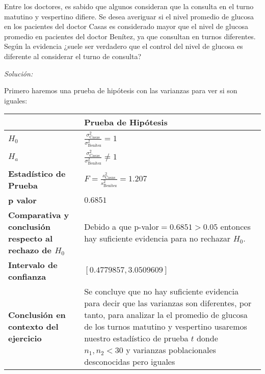 \documentclass[12pt]{article}
\newenvironment{problem}[2][Problema]{\begin{trivlist}
\item[\hskip \labelsep {\bfseries #1}\hskip \labelsep {\bfseries #2.}]}{\end{trivlist}}
\newenvironment{sol}
    {\emph{Solución:}
    }
    {
    }
\begin{document}
\begin{problem}{D}
Entre los doctores, es sabido que algunos consideran que la consulta en el turno matutino y vespertino difiere. Se desea averiguar si el nivel promedio de glucosa en los pacientes del doctor Casas es considerado mayor que el nivel de glucosa promedio en pacientes del doctor Benítez, ya que consultan en turnos diferentes.  Según la evidencia ¿suele ser verdadero que el control del nivel de glucosa es diferente al considerar el turno de consulta?
\end{problem}

\begin{sol}
Primero haremos una prueba de hipótesis con las varianzas para ver si son iguales:
\begin{table}[h!]
\centering
\begin{tabular}{|>{\raggedright\arraybackslash}m{6cm}|>{\raggedright\arraybackslash}m{6cm}|}
\hline
 & \textbf{Prueba de Hipótesis} \\ \hline
$H_0$ & \vspace{0.5cm}$\frac{\sigma_{\text{Casas}}^2}{\sigma_{\text{Benítez}
}^2}=1$ \vspace{0.5cm}\\ \hline
$H_a$ & \vspace{0.5cm} $\frac{\sigma_{\text{Casas}}^2}{\sigma_{\text{Benítez}
}^2}\neq1$ \vspace{0.5cm}\\ \hline
\textbf{Estadístico de Prueba} & \vspace{0.5cm}$F = \frac{s_\text{Casas}^2}{s_\text{Benítez}^2}=1.207$\vspace{0.5cm} \\ \hline
\textbf{p valor} & $0.6851$ \\ \hline
\textbf{Comparativa y conclusión respecto al rechazo de $H_0$} & Debido a que p-valor$=0.6851>0.05$ entonces hay suficiente evidencia para no rechazar $H_0$. \\ \hline
\textbf{Intervalo de confianza} & $[0.4779857,3.0509609]$ \\ \hline
\textbf{Conclusión en contexto del ejercicio} & Se concluye que no hay suficiente evidencia para decir que las varianzas son diferentes, por tanto, para analizar la el promedio de glucosa de los turnos matutino y vespertino usaremos nuestro estadístico de prueba $t$ donde $n_1 ,n_2 < 30$ y varianzas poblacionales desconocidas pero iguales \\ \hline
\end{tabular}
\label{tab:hipotesis}
\end{table}


\end{sol}
\end{document}
